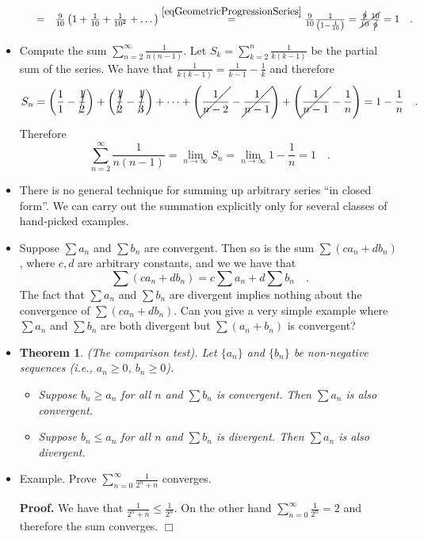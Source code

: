 \documentclass[12pt]{book}
\newenvironment{proof}[1][]{ \textbf{Proof#1.} }{$\Box$\medskip}
\newtheorem{theorem}{Theorem}[section]
\begin{document}
\begin{itemize}
\[\begin{array}{rcl}
&=&\frac{9}{10}\left(1+\frac{1}{10}+\frac{1}{10^2}+\dots \right)\stackrel{\eqref{eqGeometricProgressionSeries}}{=} \frac{9}{10}\frac{1}{\left(1-\frac{1}{10}\right)}=\frac{\cancel{9}}{\cancel{10}}\frac{\cancel{10}}{\cancel{9}}= 1\quad .
\end{array}
\]
\item Compute the sum $\sum\limits_{n=2}^{\infty}\frac{1}{n(n-1)}$. Let $S_k= \sum\limits_{k=2}^{n}\frac{1}{k(k-1)}$ be the partial sum of the series. We have that $\frac{1}{k(k-1)}= \frac{1}{k-1}-\frac{1}k$ and therefore 
\[
S_n= \left(\frac11-\cancel{\frac12}\right)+\left(\cancel{\frac12}-\cancel{\frac13}\right)+\dots + \left(\cancel{\frac1{n-2}}-\cancel{\frac{1}{n-1}}\right)+\left(\cancel{\frac1{n-1}}-\frac1n\right)
=1-\frac{1}n\quad .
\]
Therefore 
\[
\sum\limits_{n=2}^{\infty}\frac{1}{n(n-1)}= \lim\limits_{n\to \infty} S_n=\lim\limits_{n\to \infty} 1-\frac{1}n=1\quad .
\]
\item There is no general technique for summing up arbitrary series ``in closed form''. We can carry out the summation explicitly only for several classes of hand-picked examples. 

\item Suppose $\sum a_n$ and $\sum b_n$ are convergent. Then so is the sum $\sum (ca_n+db_n)$, where $c, d$ are arbitrary constants, and we we have that
\begin{equation}\label{eqLinearCombinationConvergentSeriesIsConvergent}
\sum (ca_n+db_n) = c\sum a_n +d\sum b_n\quad . 
\end{equation}
The fact that $\sum a_n$ and $\sum b_n$ are divergent implies nothing about the convergence of $\sum (ca_n+db_n) $. Can you give a very simple example where $\sum a_n$ and $\sum b_n$  are both divergent but $ \sum (a_n+b_n)$ is convergent?
\item \begin{theorem}\label{thSeriesComparisonTest} (The comparison test). Let $\{a_n\}$ and $\{b_n\}$ be non-negative sequences (i.e., $a_n\geq 0$, $b_n\geq 0$).
\begin{itemize}
\item Suppose $b_n\geq a_n$ for all $n$ and $\sum b_n$ is convergent. Then $\sum a_n$ is also convergent.
\item Suppose  $b_n\leq a_n$ for all $n$ and $\sum b_n$ is divergent. Then $\sum a_n$ is also divergent.
\end{itemize} 
\end{theorem}
\item Example. Prove $\sum_{n=0}^{\infty}\frac{1}{2^n+n}$ converges. 

\begin{proof}
We have that $\frac{1}{2^n+n}\leq\frac{1}{2^n}$. On the other hand $\sum_{n=0}^{\infty}\frac{1}{2^n}=2$ and therefore the sum converges.
\end{proof}

\end{itemize}
\end{document}
